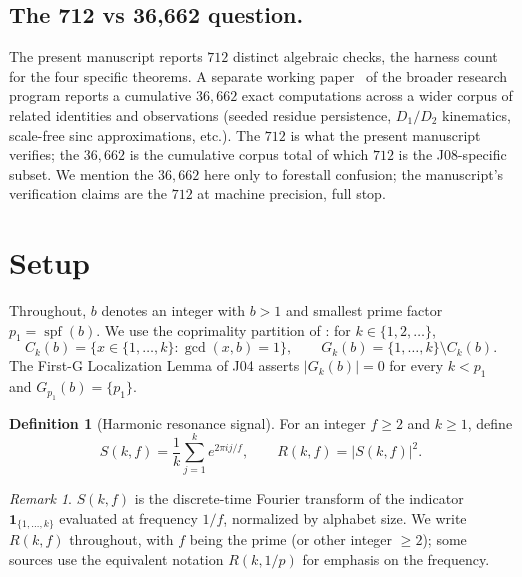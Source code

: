 \documentclass[11pt,reqno]{amsart}
\theoremstyle{plain}
\theoremstyle{definition}
\newtheorem{definition}[theorem]{Definition}
\theoremstyle{remark}
\newtheorem{remark}[theorem]{Remark}
\DeclareMathOperator{\spf}{spf}
\begin{document}
\subsection*{The 712 vs 36{,}662 question.}

The present manuscript reports $712$ distinct algebraic checks,
the harness count for the four specific theorems. A separate
working paper~\cite{Sanders2026WP35} of the broader research
program reports a cumulative $36{,}662$ exact computations
across a wider corpus of related identities and observations
(seeded residue persistence, $D_1/D_2$ kinematics, scale-free
sinc approximations, etc.). The $712$ is what the present
manuscript verifies; the $36{,}662$ is the cumulative corpus
total of which $712$ is the J08-specific subset. We mention the
$36{,}662$ here only to forestall confusion; the manuscript's
verification claims are the $712$ at machine precision, full
stop.

\section{Setup}
\label{sec:setup}

Throughout, $b$ denotes an integer with $b > 1$ and smallest prime
factor $p_1 = \spf(b)$. We use the coprimality partition of
\cite{J04Sanders}: for $k \in \{1, 2, \ldots\}$,
\[
  C_k(b) = \{ x \in \{1, \ldots, k\} : \gcd(x, b) = 1 \},
  \qquad
  G_k(b) = \{1, \ldots, k\} \setminus C_k(b).
\]
The First-G Localization Lemma of J04 \cite[Theorem~3.1]{J04Sanders}
asserts $|G_k(b)| = 0$ for every $k < p_1$ and
$G_{p_1}(b) = \{p_1\}$.

\begin{definition}[Harmonic resonance signal]
\label{def:R}
For an integer $f \ge 2$ and $k \ge 1$, define
\begin{equation}
  S(k, f) = \frac{1}{k} \sum_{j=1}^{k} e^{2\pi i j / f},
  \qquad
  R(k, f) = |S(k, f)|^2.
  \label{eq:RSdef}
\end{equation}
\end{definition}

\begin{remark}
$S(k, f)$ is the discrete-time Fourier transform of the indicator
$\mathbf{1}_{\{1, \ldots, k\}}$ evaluated at frequency $1/f$,
normalized by alphabet size. We write $R(k, f)$ throughout, with
$f$ being the prime (or other integer $\ge 2$); some sources use
the equivalent notation $R(k, 1/p)$ for emphasis on the frequency.
\end{remark}
\end{document}
